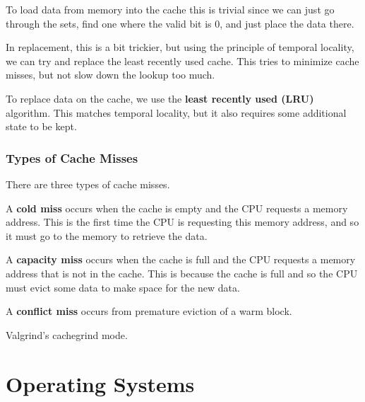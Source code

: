 \documentclass{article}
\begin{document}
      \begin{theorem}[Placement]
        To load data from memory into the cache this is trivial since we can just go through the sets, find one where the valid bit is $0$, and just place the data there.  
      \end{theorem}

      In replacement, this is a bit trickier, but using the principle of temporal locality, we can try and replace the least recently used cache. This tries to minimize cache misses, but not slow down the lookup too much. 

      \begin{theorem}[Replacement]
        To replace data on the cache, we use the \textbf{least recently used (LRU)} algorithm. This matches temporal locality, but it also requires some additional state to be kept. 
      \end{theorem}

    \subsubsection{Types of Cache Misses} 

      There are three types of cache misses. 

      \begin{definition}
        A \textbf{cold miss} occurs when the cache is empty and the CPU requests a memory address. This is the first time the CPU is requesting this memory address, and so it must go to the memory to retrieve the data.
      \end{definition}
      
      \begin{definition}
        A \textbf{capacity miss} occurs when the cache is full and the CPU requests a memory address that is not in the cache. This is because the cache is full and so the CPU must evict some data to make space for the new data.
      \end{definition}

      \begin{definition}
        A \textbf{conflict miss} occurs from premature eviction of a warm block. 
      \end{definition}

    Valgrind's cachegrind mode. 

\section{Operating Systems}
\end{document}
